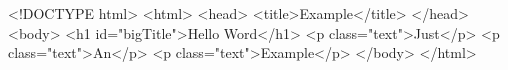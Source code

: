 <!DOCTYPE html>
<html>
    <head>
        <title>Example</title>
    </head>
    <body>
        <h1 id="bigTitle">Hello Word</h1>
        <p class="text">Just</p>
        <p class="text">An</p>
        <p class="text">Example</p>
    </body>
</html>